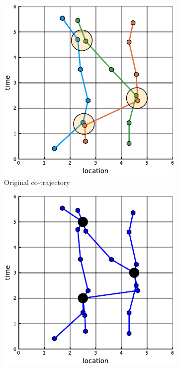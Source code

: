 \documentclass[12pt]{article}
\theoremstyle{definition}
\begin{document}
\begin{figure}
    \centering
    \begin{subfigure}[t]{0.45\textwidth}
      \includegraphics[width=\textwidth]{graph_swap_full-a.pdf}
      \caption{Original co-trajectory}
      \label{fig:graph-swap-full-a}
    \end{subfigure}
    \begin{subfigure}[t]{0.45\textwidth}
      \includegraphics[width=\textwidth]{graph_swap_full-b.pdf}

\end{subfigure}
\end{figure}
\end{document}

